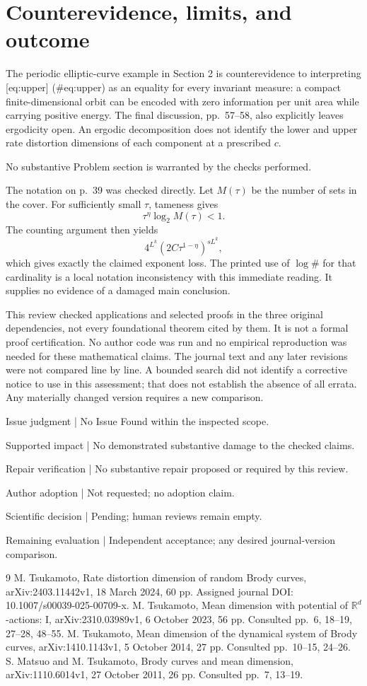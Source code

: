 \documentclass[10pt]{article}
\begin{document}
\section*{Counterevidence, limits, and outcome}
The periodic elliptic-curve example in Section 2 is counterevidence to interpreting [eq:upper] (\#eq:upper) as an equality for every invariant measure: a compact finite-dimensional orbit can be encoded with zero information per unit area while carrying positive energy. The final discussion, pp. 57–58, also explicitly leaves ergodicity open. An ergodic decomposition does not identify the lower and upper rate distortion dimensions of each component at a prescribed \(c\).\par
No substantive Problem section is warranted by the checks performed.\par
The notation on p. 39 was checked directly. Let \(M(\tau)\) be the number of sets in the cover. For sufficiently small \(\tau\), tameness gives \[\tau^\eta\log_2 M(\tau)<1.\] The counting argument then yields \[4^{L^k}(2C\tau^{1-\eta})^{sL^k},\] which gives exactly the claimed exponent loss. The printed use of \(\log\#\) for that cardinality is a local notation inconsistency with this immediate reading. It supplies no evidence of a damaged main conclusion.\par
This review checked applications and selected proofs in the three original dependencies, not every foundational theorem cited by them. It is not a formal proof certification. No author code was run and no empirical reproduction was needed for these mathematical claims. The journal text and any later revisions were not compared line by line. A bounded search did not identify a corrective notice to use in this assessment; that does not establish the absence of all errata. Any materially changed version requires a new comparison.\par
Issue judgment | No Issue Found within the inspected scope.\par
Supported impact | No demonstrated substantive damage to the checked claims.\par
Repair verification | No substantive repair proposed or required by this review.\par
Author adoption | Not requested; no adoption claim.\par
Scientific decision | Pending; human reviews remain empty.\par
Remaining evaluation | Independent acceptance; any desired journal-version comparison.\par
9 M. Tsukamoto, Rate distortion dimension of random Brody curves, arXiv:2403.11442v1, 18 March 2024, 60 pp. Assigned journal DOI: 10.1007/s00039-025-00709-x. M. Tsukamoto, Mean dimension with potential of \(\mathbb R^d\)-actions: I, arXiv:2310.03989v1, 6 October 2023, 56 pp. Consulted pp. 6, 18–19, 27–28, 48–55. M. Tsukamoto, Mean dimension of the dynamical system of Brody curves, arXiv:1410.1143v1, 5 October 2014, 27 pp. Consulted pp. 10–15, 24–26. S. Matsuo and M. Tsukamoto, Brody curves and mean dimension, arXiv:1110.6014v1, 27 October 2011, 26 pp. Consulted pp. 7, 13–19.\par
\end{document}
